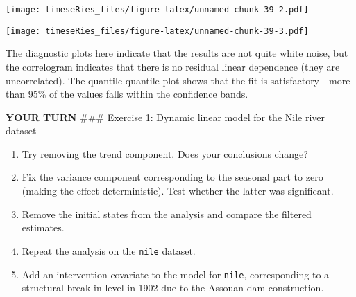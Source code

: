 \documentclass[]{book}
\newenvironment{Shaded}{\begin{snugshade}}{\end{snugshade}}
\newcommand{\KeywordTok}[1]{\textcolor[rgb]{0.13,0.29,0.53}{\textbf{#1}}}
\newcommand{\DataTypeTok}[1]{\textcolor[rgb]{0.13,0.29,0.53}{#1}}
\newcommand{\DecValTok}[1]{\textcolor[rgb]{0.00,0.00,0.81}{#1}}
\newcommand{\FloatTok}[1]{\textcolor[rgb]{0.00,0.00,0.81}{#1}}
\newcommand{\StringTok}[1]{\textcolor[rgb]{0.31,0.60,0.02}{#1}}
\newcommand{\CommentTok}[1]{\textcolor[rgb]{0.56,0.35,0.01}{\textit{#1}}}
\newcommand{\ControlFlowTok}[1]{\textcolor[rgb]{0.13,0.29,0.53}{\textbf{#1}}}
\newcommand{\OperatorTok}[1]{\textcolor[rgb]{0.81,0.36,0.00}{\textbf{#1}}}
\newcommand{\NormalTok}[1]{#1}
\providecommand{\tightlist}{%
  \setlength{\itemsep}{0pt}\setlength{\parskip}{0pt}}
\begin{document}
\texttt{[image: timeseRies\_files/figure-latex/unnamed-chunk-39-2.pdf]}

\begin{Shaded}
\end{Shaded}

\texttt{[image: timeseRies\_files/figure-latex/unnamed-chunk-39-3.pdf]}

The diagnostic plots here indicate that the results are not quite white
noise, but the correlogram indicates that there is no residual linear
dependence (they are uncorrelated). The quantile-quantile plot shows
that the fit is satisfactory - more than 95\% of the values falls within
the confidence bands.

\textbf{YOUR TURN} \#\#\# Exercise 1: Dynamic linear model for the Nile
river dataset

\begin{enumerate}
\def\labelenumi{\arabic{enumi}.}
\tightlist
\item
  Try removing the trend component. Does your conclusions change?
\item
  Fix the variance component corresponding to the seasonal part to zero
  (making the effect deterministic). Test whether the latter was
  significant.
\item
  Remove the initial states from the analysis and compare the filtered
  estimates.
\item
  Repeat the analysis on the \texttt{nile} dataset.
\item
  Add an intervention covariate to the model for \texttt{nile},
  corresponding to a structural break in level in 1902 due to the
  Assouan dam construction.
\end{enumerate}
\end{document}
